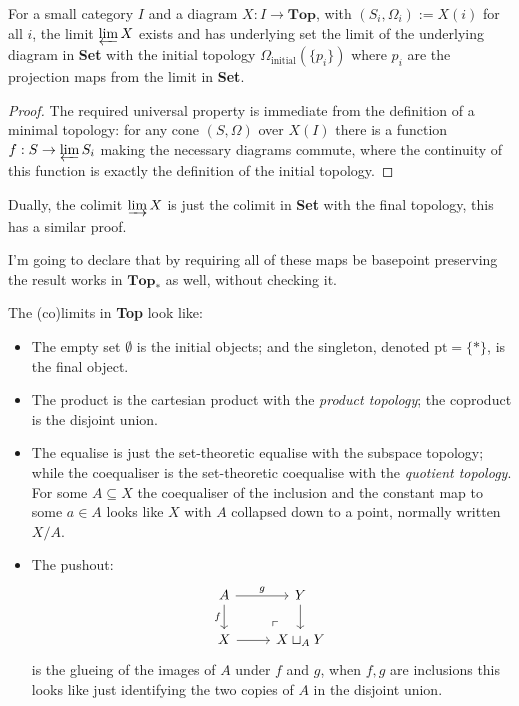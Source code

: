 \documentclass[a4paper]{article}
\begin{document}
\begin{proposition}
    For a small category $I$ and a diagram $X:I\rightarrow \textbf{Top}$, with $(S_i,\Omega_i):= X(i)$ for all $i$, the limit $\varprojlim X$ exists and has underlying set the limit of the underlying diagram in \textbf{Set} with the initial topology $\Omega_{\text{initial}}(\{p_i\})$ where $p_i$ are the projection maps from the limit in \textbf{Set}.
    \begin{proof}
        The required universal property is immediate from the definition of a minimal topology: for any cone $(S,\Omega)$ over $X(I)$ there is a function $f:S\rightarrow \varprojlim S_i$ making the necessary diagrams commute, where the continuity of this function is exactly the definition of the initial topology.
    \end{proof}
    Dually, the colimit $\varinjlim X$ is just the colimit in \textbf{Set} with the final topology, this has a similar proof.
\end{proposition}
I'm going to declare that by requiring all of these maps be basepoint preserving the result works in $\textbf{Top}_*$ as well, without checking it.

\begin{definition}
    The (co)limits in \textbf{Top} look like:
    \begin{itemize}
        \item The empty set $\emptyset$ is the initial objects; and the singleton, denoted $\text{pt}=\{*\}$, is the final object.
        \item The product is the cartesian product with the \textit{product topology}; the coproduct is the disjoint union.
        \item The equalise is just the set-theoretic equalise with the subspace topology; while the coequaliser is the set-theoretic coequalise with the \textit{quotient topology}. For some $A\subseteq X$ the coequaliser of the inclusion and the constant map to some $a\in A$ looks like $X$ with $A$ collapsed down to a point, normally written $X/A$.
        \item The pushout: \[
        \begin{tikzcd}
            A 
                \arrow[r, "g"] 
                \arrow[d, "f", swap] 
                \arrow[dr, phantom, very near end, "\ulcorner"] 
                &
            Y 
                \arrow[d]
                \\
            X 
                \arrow[r] 
                &
            X \sqcup_A Y
        \end{tikzcd}
        \] is the glueing of the images of $A$ under $f$ and $g$, when $f,g$ are inclusions this looks like just identifying the two copies of $A$ in the disjoint union.
    \end{itemize}
\end{definition}
\end{document}
